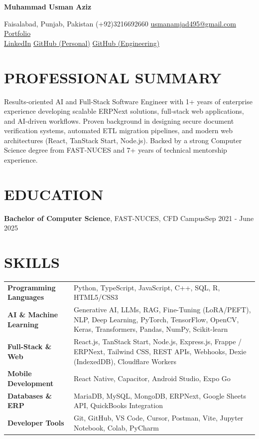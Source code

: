 \documentclass[11pt]{article}
\newcommand{\name}[1]{\begin{center}{\Huge \bfseries #1}\end{center}}
\newcommand{\address}[1]{\begin{center}\small #1\end{center}\vspace{-8pt}}
\newcommand{\rSection}[1]{\section{\uppercase{#1}}}
\begin{document}
\pagestyle{empty}

\name{Muhammad Usman Aziz}

\address{
\faMapMarker*{} Faisalabad, Punjab, Pakistan \quad
\faPhone{} (+92)3216692660 \quad
\faEnvelope{} \href{mailto:usmanamjad495@gmail.com}{usmanamjad495@gmail.com} \quad
\faGlobe{} \href{https://usmanamjad.vercel.app/}{Portfolio} \\ \vspace{3pt}
\faLinkedin{} \href{https://www.linkedin.com/in/usmanamjad41/}{LinkedIn} \quad
\faGithub{} \href{https://github.com/MaAn-41}{GitHub (Personal)} \quad
\faGithub{} \href{https://github.com/usmanagro7c-eng}{GitHub (Engineering)}
}

\rSection{Professional Summary}
Results-oriented AI and Full-Stack Software Engineer with 1+ years of enterprise experience developing scalable ERPNext solutions, full-stack web applications, and AI-driven workflows. Proven background in designing secure document verification systems, automated ETL migration pipelines, and modern web architectures (React, TanStack Start, Node.js). Backed by a strong Computer Science degree from FAST-NUCES and 7+ years of technical mentorship experience.

\rSection{Education}
{\bf Bachelor of Computer Science}, FAST-NUCES, CFD Campus\hfill {Sep 2021 - June 2025}

\vspace{-1em}

\rSection{Skills}
\begin{tabularx}{\textwidth}{ @{} >{\bfseries}l @{\hspace{3ex}} X @{} }
Programming Languages & Python, TypeScript, JavaScript, C++, SQL, R, HTML5/CSS3 \\
AI \& Machine Learning & Generative AI, LLMs, RAG, Fine-Tuning (LoRA/PEFT), NLP, Deep Learning, PyTorch, TensorFlow, OpenCV, Keras, Transformers, Pandas, NumPy, Scikit-learn \\
Full-Stack \& Web & React.js, TanStack Start, Node.js, Express.js, Frappe / ERPNext, Tailwind CSS, REST APIs, Webhooks, Dexie (IndexedDB), Cloudflare Workers \\
Mobile Development & React Native, Capacitor, Android Studio, Expo Go \\
Databases \& ERP & MariaDB, MySQL, MongoDB, ERPNext, Google Sheets API, QuickBooks Integration \\
Developer Tools & Git, GitHub, VS Code, Cursor, Postman, Vite, Jupyter Notebook, Colab, PyCharm \\
\end{tabularx}
\end{document}

